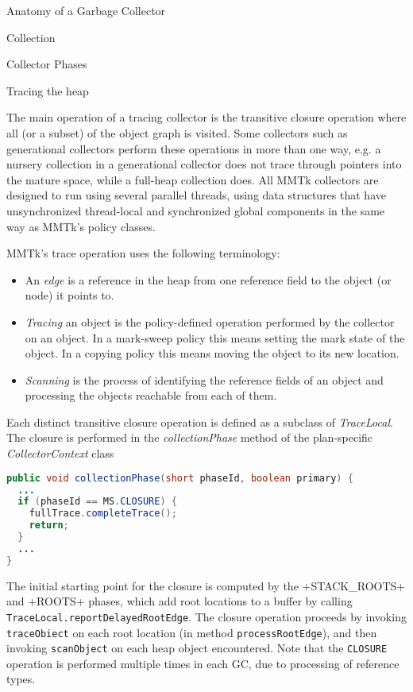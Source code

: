 \begin{section}{Anatomy of a Garbage Collector}
\begin{subsection}{Collection}
\begin{subsubsection}{Collector Phases}
\end{subsubsection}

\begin{subsubsection}{Tracing the heap}

The main operation of a tracing collector is the transitive closure operation where all (or a subset) of the object graph is visited.  Some collectors such as generational collectors perform these operations in more than one way, e.g. a nursery collection in a generational collector does not trace through pointers into the mature space, while a full-heap collection does.  All MMTk collectors are designed to run using several parallel threads, using data structures that have unsynchronized thread-local and synchronized global components in the same way as MMTk's policy classes.

MMTk's trace operation uses the following terminology:
\begin{itemize}
  \item An \textit{edge} is a reference in the heap from one reference field to the object (or node) it points to.
  \item \textit{Tracing} an object is the policy-defined operation performed by the collector on an object.  In a mark-sweep policy this means setting the mark state of the object.  In a copying policy this means moving the object to its new location.
  \item \textit{Scanning} is the process of identifying the reference fields of an object and processing the objects reachable from each of them.
\end{itemize}

Each distinct transitive closure operation is defined as a subclass of \textit{TraceLocal}.  The closure is performed in the \textit{collectionPhase} method of the plan-specific \textit{CollectorContext} class

\begin{lstlisting}[language=Java,title=MSCollector.java]
public void collectionPhase(short phaseId, boolean primary) {
  ...
  if (phaseId == MS.CLOSURE) {
    fullTrace.completeTrace();
    return;
  }
  ...
}
\end{lstlisting}

The initial starting point for the closure is computed by the \spverb+STACK_ROOTS+ and \spverb+ROOTS+ phases, which add root locations to a buffer by calling \texttt{Tra\-ce\-Lo\-cal.re\-port\-De\-lay\-ed\-Root\-Ed\-ge}.  The closure operation proceeds by invoking \texttt{traceObiect} on each root location (in method \texttt{processRootEdge}), and then invoking \texttt{scanObject} on each heap object encountered.  Note that the \texttt{CLOSURE} operation is performed multiple times in each GC, due to processing of reference types.

\end{subsubsection}

\end{subsection}

\end{section}
